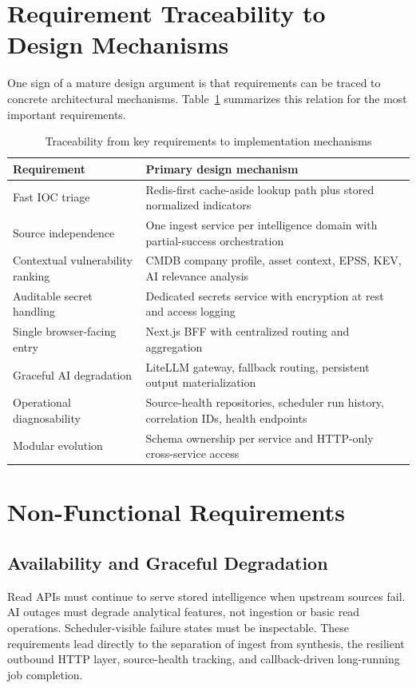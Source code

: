 \section{Requirement Traceability to Design Mechanisms}
One sign of a mature design argument is that requirements can be traced to concrete architectural mechanisms. Table~\ref{tab:req-traceability} summarizes this relation for the most important requirements.

\begin{table}[H]
\centering
\caption{Traceability from key requirements to implementation mechanisms}
\label{tab:req-traceability}
\renewcommand{\arraystretch}{1.25}
\begin{tabular}{|p{4.2cm}|p{7.0cm}|}
\hline
\textbf{Requirement} & \textbf{Primary design mechanism}\\
\hline
Fast IOC triage & Redis-first cache-aside lookup path plus stored normalized indicators\\
\hline
Source independence & One ingest service per intelligence domain with partial-success orchestration\\
\hline
Contextual vulnerability ranking & CMDB company profile, asset context, EPSS, KEV, AI relevance analysis\\
\hline
Auditable secret handling & Dedicated secrets service with encryption at rest and access logging\\
\hline
Single browser-facing entry & Next.js BFF with centralized routing and aggregation\\
\hline
Graceful AI degradation & LiteLLM gateway, fallback routing, persistent output materialization\\
\hline
Operational diagnosability & Source-health repositories, scheduler run history, correlation IDs, health endpoints\\
\hline
Modular evolution & Schema ownership per service and HTTP-only cross-service access\\
\hline
\end{tabular}
\end{table}

\section{Non-Functional Requirements}
\subsection{Availability and Graceful Degradation}
Read APIs must continue to serve stored intelligence when upstream sources fail. AI outages must degrade analytical features, not ingestion or basic read operations. Scheduler-visible failure states must be inspectable. These requirements lead directly to the separation of ingest from synthesis, the resilient outbound HTTP layer, source-health tracking, and callback-driven long-running job completion.

